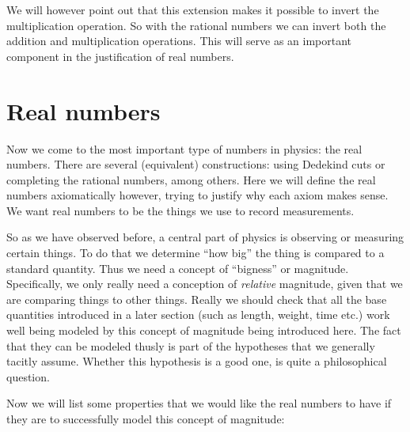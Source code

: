 We will however point out that this extension makes it possible to invert the multiplication operation. So with the rational numbers we can invert both the addition and multiplication operations. This will serve as an important component in the justification of real numbers.

\section{Real numbers}
Now we come to the most important type of numbers in physics: the real numbers. There are several (equivalent) constructions: using Dedekind cuts or completing the rational numbers, among others. Here we will define the real numbers axiomatically however, trying to justify why each axiom makes sense. We want real numbers to be the things we use to record measurements.

So as we have observed before, a central part of physics is observing or measuring certain things. To do that we determine ``how big'' the thing is compared to a standard quantity. Thus we need a concept of ``bigness'' or magnitude. Specifically, we only really need a conception of \textit{relative} magnitude, given that we are comparing things to other things. Really we should check that all the base quantities introduced in a later section (such as length, weight, time etc.) work well being modeled by this concept of magnitude being introduced here.  The fact that they can be modeled thusly is part of the hypotheses that we generally tacitly assume. Whether this hypothesis is a good one, is quite a philosophical question.

Now we will list some properties that we would like the real numbers to have if they are to successfully model this concept of magnitude:

